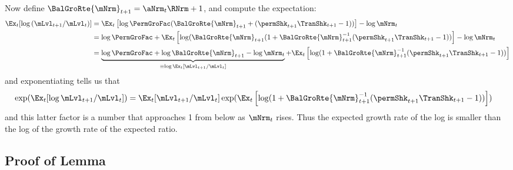 \documentclass[\econtexRoot/BufferStockTheory]{subfiles}
\begin{document}
Now define $\BalGroRte{\mNrm}_{t+1}=\aNrm_{t}\RNrm+1$, and compute the expectation:
\begin{align*}
  \Ex_{t}[\log \left(\mLvl_{t+1}/\mLvl_{t}\right)]
   & = \Ex_{t}\left[\log \PermGroFac (\BalGroRte{\mNrm}_{t+1}+(\permShk_{t+1}\TranShk_{t+1}-1))\right]- \log \mNrm_{t} 
\\ & = \log \PermGroFac + \Ex_{t}\left[\log (\BalGroRte{\mNrm}_{t+1}(1+\BalGroRte{\mNrm}_{t+1}^{-1}(\permShk_{t+1}\TranShk_{t+1}-1))\right]- \log \mNrm_{t} 
\\ & = \underbrace{\log \PermGroFac + \log \BalGroRte{\mNrm}_{t+1} - \log \mNrm_{t}}_{\equiv \log \Ex_{t}[\mLvl_{t+1}/\mLvl_{t}]} + \Ex_{t}\left[ \log (1+\BalGroRte{\mNrm}_{t+1}^{-1}(\permShk_{t+1}\TranShk_{t+1}-1))\right]
\end{align*}
and exponentiating tells us that
\begin{align}
  \exp(\Ex_{t}[\log \mLvl_{t+1}/\mLvl_{t}]) & = \Ex_{t}[\mLvl_{t+1}/\mLvl_{t}]\exp( \Ex_{t}\left[ \log (1+\BalGroRte{\mNrm}_{t+1}^{-1}(\permShk_{t+1}\TranShk_{t+1}-1))\right])
\end{align}
and this latter factor is a number that approaches 1 from below as $\mNrm_{t}$ rises.  Thus the expected growth rate of the log is smaller than the log of the growth rate of the expected ratio.


\subsection{Proof of Lemma}%
\end{document}
